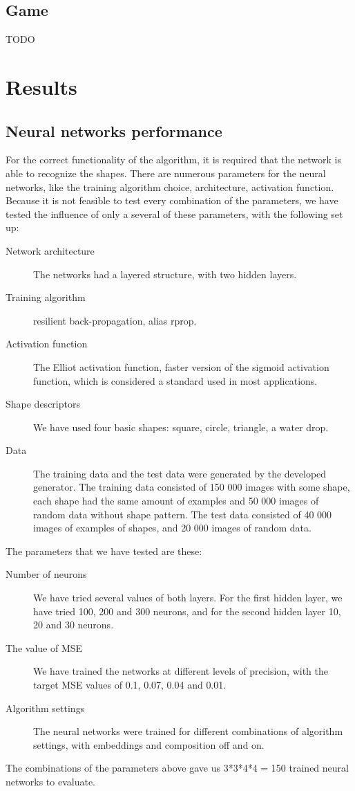 \begin{description}
\begin{description}
\section{Game}
TODO

\chapter{Results}

\section{Neural networks performance}
For the correct functionality of the algorithm, it is required that the network is able to recognize the shapes. There are numerous parameters for the neural networks, like the training algorithm choice, architecture, activation function. Because it is not feasible to test every combination of the parameters, we have tested the influence of only a several of these parameters, with the following set up:
\begin{description}
\item [Network architecture] The networks had a layered structure, with two hidden layers.
\item [Training algorithm] resilient back-propagation, alias rprop.
\item [Activation function] The Elliot activation function, faster version of the sigmoid activation function, which is considered a standard used in most applications.
\item [Shape descriptors] We have used four basic shapes: square, circle, triangle, a water drop. 
\item [Data] The training data and the test data were generated by the developed generator. The training data consisted of 150 000 images with some shape, each shape had the same amount of examples and 50 000 images of random data without shape pattern. The test data consisted of 40 000 images of examples of shapes, and 20 000 images of random data.
\end{description}

The parameters that we have tested are these:
\begin{description}
\item [Number of neurons] We have tried several values of both layers. For the first hidden layer, we have tried 100, 200 and 300 neurons, and for the second hidden layer 10, 20 and 30 neurons. 
\item [The value of MSE] We have trained the networks at different levels of precision, with the target MSE values of 0.1, 0.07, 0.04 and 0.01.   
\item [Algorithm settings] The neural networks were trained for different combinations of algorithm settings, with embeddings and composition off and on.
\end{description}
The combinations of the parameters above gave us 3*3*4*4 = 150 trained neural networks to evaluate.


\end{description}
\end{description}
